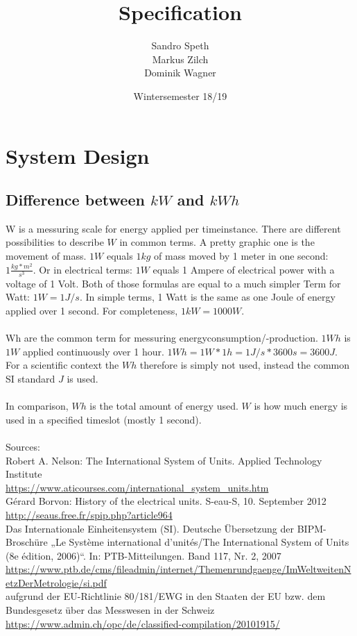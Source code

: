\documentclass[12pt]{scrartcl}
\title{Specification}
\date{Wintersemester 18/19}
\author{Sandro Speth\\
Markus Zilch\\
Dominik Wagner}
\begin{document}
\maketitle


\section{System Design}\label{sec:systemdesign}

\subsection{Difference between $kW$ and $kWh$}\label{sec:diffEnergy}
W is a messuring scale for energy applied per timeinstance.
There are different possibilities to describe $W$ in common terms.
A pretty graphic one is the movement of mass.
$1W$ equals $1kg$ of mass moved by 1 meter in one second: $1 \frac{kg*m^2}{s^3}$.
Or in electrical terms: $1W$ equals 1 Ampere of electrical power with a voltage of 1 Volt.
Both of those formulas are equal to a much simpler Term for Watt: $1 W = 1 J/s$.
In simple terms, 1 Watt is the same as one Joule of energy applied over 1 second.
For completeness, $1kW = 1000 W$.\\
\\
Wh are the common term for messuring energyconsumption/-production.
$1Wh$ is $1W$ applied continuously over 1 hour.
 $1Wh = 1 W * 1h = 1 J/s * 3600s = 3600J$.
 For a scientific context the $Wh$ therefore is simply not used, instead the common SI standard $J$ is used.\\
\\
In comparison, $Wh$ is the total amount of energy used. $W$ is how much energy is used in a specified timeslot (mostly 1 second).\\
\\
Sources:\\
Robert A. Nelson: The International System of Units. Applied Technology Institute\\
\url{https://www.aticourses.com/international_system_units.htm}\\
Gérard Borvon: History of the electrical units. S-eau-S, 10. September 2012\\
\url{http://seaus.free.fr/spip.php?article964}\\
Das Internationale Einheitensystem (SI). Deutsche Übersetzung der BIPM-Broschüre „Le Système international d’unités/The International System of Units (8e édition, 2006)“. In: PTB-Mitteilungen. Band 117, Nr. 2, 2007\\
\url{https://www.ptb.de/cms/fileadmin/internet/Themenrundgaenge/ImWeltweitenNetzDerMetrologie/si.pdf}\\
aufgrund der EU-Richtlinie 80/181/EWG in den Staaten der EU bzw. dem Bundesgesetz über das Messwesen in der Schweiz\\
\url{https://www.admin.ch/opc/de/classified-compilation/20101915/}
\end{document}
